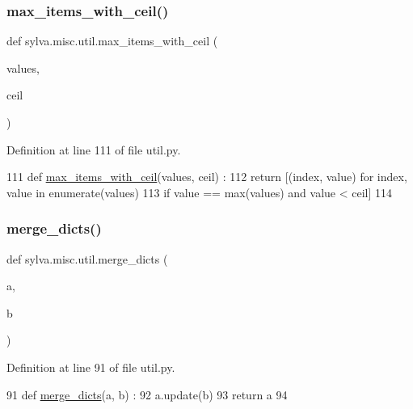 \subsubsection{\texorpdfstring{max\+\_\+items\+\_\+with\+\_\+ceil()}{max\_items\_with\_ceil()}}
{\footnotesize\ttfamily def sylva.\+misc.\+util.\+max\+\_\+items\+\_\+with\+\_\+ceil (\begin{DoxyParamCaption}\item[{}]{values,  }\item[{}]{ceil }\end{DoxyParamCaption})}



Definition at line 111 of file util.\+py.


\begin{DoxyCode}
111 \textcolor{keyword}{def }\hyperlink{namespacesylva_1_1misc_1_1util_aea54b6ab8ee247ea3d042b09b5333c1c}{max\_items\_with\_ceil}(values, ceil) :
112   \textcolor{keywordflow}{return} [(index, value) \textcolor{keywordflow}{for} index, value \textcolor{keywordflow}{in} enumerate(values)
113     \textcolor{keywordflow}{if} value == max(values) \textcolor{keywordflow}{and} value < ceil]
114 
\end{DoxyCode}
\mbox{\label{namespacesylva_1_1misc_1_1util_a5cd57a1d193048a940df5f3795423f8c}} 
\subsubsection{\texorpdfstring{merge\+\_\+dicts()}{merge\_dicts()}}
{\footnotesize\ttfamily def sylva.\+misc.\+util.\+merge\+\_\+dicts (\begin{DoxyParamCaption}\item[{}]{a,  }\item[{}]{b }\end{DoxyParamCaption})}



Definition at line 91 of file util.\+py.


\begin{DoxyCode}
91 \textcolor{keyword}{def }\hyperlink{namespacesylva_1_1misc_1_1util_a5cd57a1d193048a940df5f3795423f8c}{merge\_dicts}(a, b) :
92   a.update(b)
93   \textcolor{keywordflow}{return} a
94 
\end{DoxyCode}
\mbox{\label{namespacesylva_1_1misc_1_1util_a167f655cf126d75c98e671a0672087ca}} 
